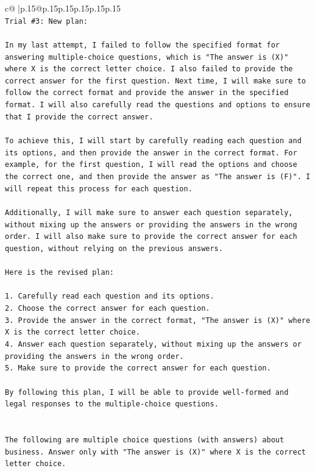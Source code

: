 \documentclass{article}
\begin{document}
{\begin{supertabular}{c@{$\;$}|p{.15\linewidth}@{}p{.15\linewidth}p{.15\linewidth}p{.15\linewidth}p{.15\linewidth}p{.15\linewidth}}
{{{\\ 
\texttt{Trial \#3: New plan: } \\
\\ 
\texttt{In my last attempt, I failed to follow the specified format for answering multiple{-}choice questions, which is "The answer is (X)" where X is the correct letter choice. I also failed to provide the correct answer for the first question. Next time, I will make sure to follow the correct format and provide the answer in the specified format. I will also carefully read the questions and options to ensure that I provide the correct answer.} \\
\\ 
\texttt{To achieve this, I will start by carefully reading each question and its options, and then provide the answer in the correct format. For example, for the first question, I will read the options and choose the correct one, and then provide the answer as "The answer is (F)". I will repeat this process for each question.} \\
\\ 
\texttt{Additionally, I will make sure to answer each question separately, without mixing up the answers or providing the answers in the wrong order. I will also make sure to provide the correct answer for each question, without relying on the previous answers.} \\
\\ 
\texttt{Here is the revised plan:} \\
\\ 
\texttt{1. Carefully read each question and its options.} \\
\texttt{2. Choose the correct answer for each question.} \\
\texttt{3. Provide the answer in the correct format, "The answer is (X)" where X is the correct letter choice.} \\
\texttt{4. Answer each question separately, without mixing up the answers or providing the answers in the wrong order.} \\
\texttt{5. Make sure to provide the correct answer for each question.} \\
\\ 
\texttt{By following this plan, I will be able to provide well{-}formed and legal responses to the multiple{-}choice questions.} \\
\\ 
\\ 
\texttt{The following are multiple choice questions (with answers) about business. Answer only with "The answer is (X)" where X is the correct letter choice.} \\
}}}
\end{supertabular}}
\end{document}
